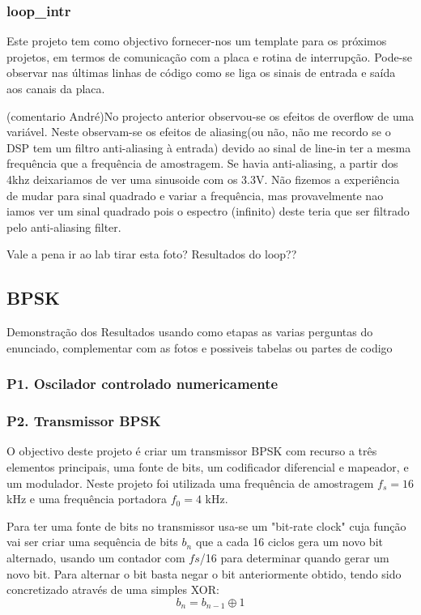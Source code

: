 \documentclass[11pt]{article}
\begin{document}
\subsubsection{loop\_intr}
Este projeto tem como objectivo fornecer-nos um template para os próximos projetos, em termos de comunicação com a placa e rotina de interrupção. Pode-se observar nas últimas linhas de código como se liga os sinais de entrada e saída aos canais da placa.

(comentario André)No projecto anterior observou-se os efeitos de overflow de uma variável. Neste observam-se os efeitos de aliasing(ou não, não me recordo se o DSP tem um filtro anti-aliasing à entrada)  devido ao sinal de line-in ter a mesma frequência que a frequência de amostragem. Se havia anti-aliasing, a partir dos 4khz deixariamos de ver uma sinusoide com os 3.3V. Não fizemos a experiência de mudar para sinal quadrado e variar a frequência, mas provavelmente nao iamos ver um sinal quadrado pois o espectro (infinito) deste teria que ser filtrado pelo anti-aliasing filter.

Vale a pena ir ao lab tirar esta foto?
Resultados do loop??

\subsection{BPSK}

 Demonstração dos Resultados usando como etapas as varias perguntas do enunciado, complementar com as fotos e possiveis tabelas ou partes de codigo

\subsubsection{P1. Oscilador controlado numericamente}


\subsubsection{P2. Transmissor BPSK}

O objectivo deste projeto é criar um transmissor BPSK com recurso a três elementos principais, uma fonte de bits, um codificador diferencial e mapeador, e um modulador.
Neste projeto foi utilizada uma frequência de amostragem $f_s=16$ kHz e uma frequência portadora $f_0=4$ kHz.

Para ter uma fonte de bits no transmissor usa-se um "bit-rate clock" cuja função vai ser criar uma sequência de bits $ b_n $ que a cada 16 ciclos gera um novo bit alternado, usando um contador com $fs$/16 para determinar quando gerar um novo bit. Para alternar o bit basta negar o bit anteriormente obtido, tendo sido concretizado através de uma simples XOR:
\begin{equation}
b_n=b_{n-1} \oplus 1
\end{equation}
\end{document}
